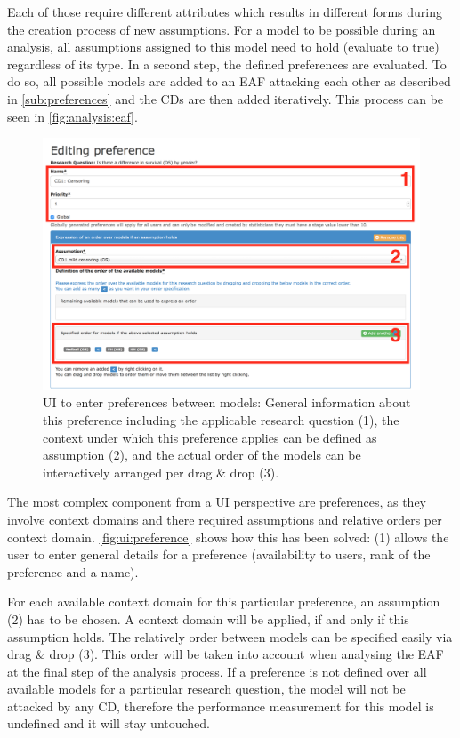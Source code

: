Each of those require different attributes which results in different forms during the creation process of new assumptions. For a model to be possible during an analysis, all assumptions assigned to this model need to hold (evaluate to true) regardless of its type. In a second step, the defined \glspl{preference} are evaluated. To do so, all possible models are added to an \gls{EAF} attacking each other as described in \autoref{sub:preferences} and the \glspl{CD} are then added iteratively. This process can be seen in \autoref{fig:analysis:eaf}.

\begin{figure}[!hbt]
	\centering
	\includegraphics[width=\textwidth]{figures/ui_preference}
	\caption{\gls{UI} to enter preferences between models: General information about this preference including the applicable research question (1), the context under which this preference applies can be defined as assumption (2), and the actual order of the models can be interactively arranged per drag \& drop (3).}
	\label{fig:ui:preference}
\end{figure}


The most complex component from a \gls{UI} perspective are preferences, as they involve context domains and there required assumptions and relative orders per context domain. \autoref{fig:ui:preference} shows how this has been solved: (1) allows the user to enter general details for a preference (availability to users, rank of the preference and a name). 

For each available context domain for this particular preference, an assumption (2) has to be chosen. A context domain will be applied, if and only if this assumption holds. The relatively order between models can be specified easily via drag \& drop (3). This order will be taken into account when analysing the \gls{EAF} at the final step of the analysis process. If a preference is not defined over all available models for a particular research question, the model will not be attacked by any \gls{CD}, therefore the performance measurement for this model is undefined and it will stay untouched.


